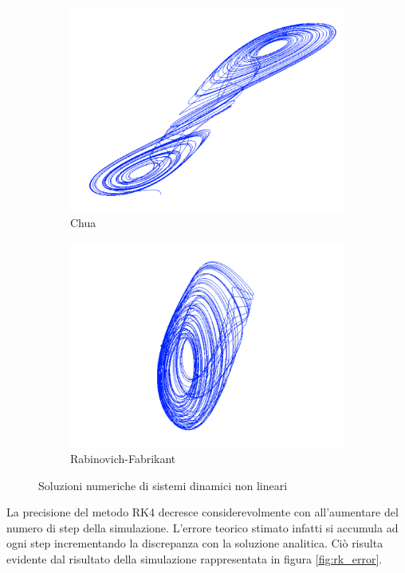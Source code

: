 \begin{figure}[H]
 \quad
 \begin{subfigure}[b]{0.5\textwidth}
  \centering
  \includegraphics[width=\textwidth]{chua}
  \caption{Chua}
  \label{fig:chua}
 \end{subfigure}
 \begin{subfigure}[b]{0.5\textwidth}
  \centering
  \includegraphics[width=\textwidth]{rf}
  \caption{Rabinovich-Fabrikant}
  \label{fig:rf}
 \end{subfigure}

 \caption{Soluzioni numeriche di sistemi dinamici non lineari}\label{fig:systems}
\end{figure}

La precisione del metodo RK4 decresce considerevolmente con all'aumentare del numero di step della simulazione. L'errore teorico stimato infatti si accumula ad ogni step incrementando la discrepanza con la soluzione analitica. Ciò risulta evidente dal risultato della simulazione rappresentata in figura \ref{fig:rk_error}.

